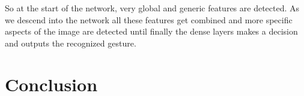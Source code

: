 \documentclass[twocolumn]{phdsymp} %
\begin{document}
So at the start of the network, very global and generic features are detected. As we descend into the network all these features get combined and more specific aspects of the image are detected until finally the dense layers makes a decision and outputs the recognized gesture.


\section{Conclusion}


\nocite{*}



%
%
%
\end{document}
